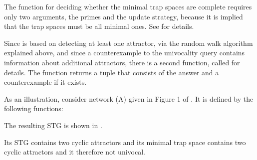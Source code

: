 \documentclass[letterpaper,10pt,english]{sphinxmanual}
\begin{document}
The function for deciding whether the minimal trap spaces are complete requires only two arguments, the primes and the update strategy,
because it is implied that the trap spaces must be all minimal ones.
See {\hyperref[\detokenize{AttractorDetection:completeness}]{}} for details.

\begin{sphinxVerbatim}[commandchars=\\\{\}]
 
\end{sphinxVerbatim}

Since {\hyperref[\detokenize{AttractorDetection:univocality}]{}} is based on detecting at least one attractor, via the random walk algorithm explained above,
and since a counterexample to the univocality query contains information about additional attractors,
there is a second function, called  for details.
The function {\hyperref[\detokenize{AttractorDetection:faithfulness-with-counterexample}]{}} returns a tuple that consists of the answer and a counterexample if it exists.

As an illustration, consider network (A) given in Figure 1 of {\hyperref[\detokenize{Bibliography:klarner2015trap}]{}}.
It is defined by the following functions:

The resulting STG is shown in {\hyperref[\detokenize{Manual:figure28}]{}}.

Its STG contains two cyclic attractors and its minimal trap space \sphinxcode{-{-}-} contains two cyclic attractors and it therefore not univocal.
\end{document}
